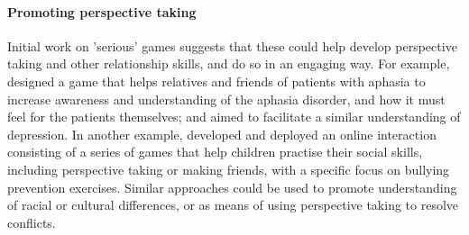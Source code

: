 \documentclass[prodmode,acmtochi]{acmsmall}
\newcommand{\rephrase}[1]{\textrm{\textrm{\textcolor{gray}{#1}}}}
\begin{document}
\paragraph{Promoting perspective taking} Initial work on 'serious' games suggests that these could help develop perspective taking and other relationship skills,  and do so in an engaging way. For example,  designed a game that helps relatives and friends of patients with aphasia to increase awareness and understanding of the aphasia disorder, and how it must feel for the patients themselves; and  aimed to facilitate a similar understanding of depression. In another example,  developed and deployed an online interaction consisting of a series of games that help children practise their social skills, including perspective taking or making friends, with a specific focus on bullying prevention exercises. Similar approaches could be used to promote understanding of racial or cultural differences, or as means of using perspective taking to resolve conflicts. %




\end{document}
